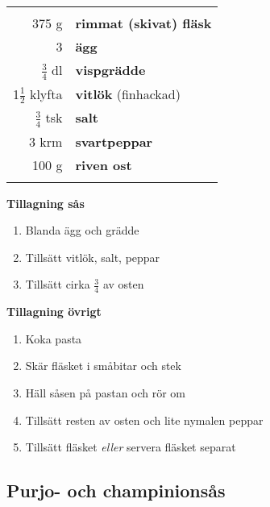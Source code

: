 \begin{table}[H]
	\begin{tabular}{rl}
	\hline
	&\\
		375 g & \textbf{rimmat (skivat) fläsk}\\
		3 & \textbf{ägg}\\
		$\frac{3}{4}$ dl & \textbf{vispgrädde}\\
		1$\frac{1}{2}$ klyfta & \textbf{vitlök} (finhackad)\\
		$\frac{3}{4}$ tsk & \textbf{salt}\\
		3 krm & \textbf{svartpeppar}\\
		100 g & \textbf{riven ost}\\
	&\\
	\hline
	\end{tabular}
\end{table}


\begin{multicols*}{2}

\noindent \textbf{Tillagning sås}
\begin{enumerate}
	\itemsep0cm
	\item Blanda ägg och grädde
	\item Tillsätt vitlök, salt, peppar
	\item Tillsätt cirka $\frac{3}{4}$ av osten
\end{enumerate}

\noindent \textbf{Tillagning övrigt}
\begin{enumerate}
	\itemsep0cm
	\item Koka pasta
	\item Skär fläsket i småbitar och stek
	\item Häll såsen på pastan och rör om
	\item Tillsätt resten av osten och lite nymalen peppar
	\item Tillsätt fläsket \textit{eller} servera fläsket separat
\end{enumerate}

\end{multicols*}

\clearpage

\subsection{Purjo- och champinionsås}

